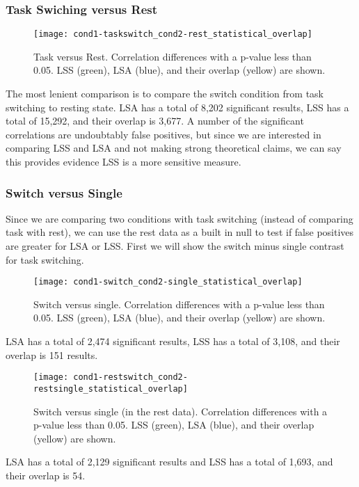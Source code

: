 \documentclass[10pt,letterpaper]{article}
\begin{document}
\subsubsection*{Task Swiching versus Rest}
\begin{figure}[H]
  \centering
  \texttt{[image: cond1-taskswitch\_cond2-rest\_statistical\_overlap]}
  \caption{
    Task versus Rest. Correlation differences with a p-value less than 0.05.
    LSS (green), LSA (blue), and their overlap (yellow) are shown.
  }
  \label{fig:taskvrest}
\end{figure}

The most lenient comparison is to compare the switch condition from task switching to resting state.
LSA has a total of 8,202 significant results, LSS has a total of 15,292,
and their overlap is 3,677.
A number of the significant correlations are undoubtably false positives, but
since we are interested in comparing LSS and LSA and not making strong theoretical claims,
we can say this provides evidence LSS is a more sensitive measure.

\subsubsection*{Switch versus Single}
Since we are comparing two conditions with task switching (instead of comparing task with rest),
we can use the rest data as a built in null to test if false positives are greater for LSA or LSS.
First we will show the switch minus single contrast for task switching.
\begin{figure}[H]
  \centering
  \texttt{[image: cond1-switch\_cond2-single\_statistical\_overlap]}
  \caption{
    Switch versus single. Correlation differences with a p-value less than 0.05.
    LSS (green), LSA (blue), and their overlap (yellow) are shown.
  }
  \label{fig:switchvsingle}
\end{figure}
LSA has a total of 2,474 significant results, LSS has a total of 3,108,
and their overlap is 151 results.

\begin{figure}[H]
  \centering
  \texttt{[image: cond1-restswitch\_cond2-restsingle\_statistical\_overlap]}
  \caption{
    Switch versus single (in the rest data). Correlation differences with a p-value less than 0.05.
    LSS (green), LSA (blue), and their overlap (yellow) are shown.
  }
  \label{fig:restswitchvsingle}
\end{figure}
LSA has a total of 2,129 significant results and LSS has a total of 1,693,
and their overlap is 54.
\end{document}
